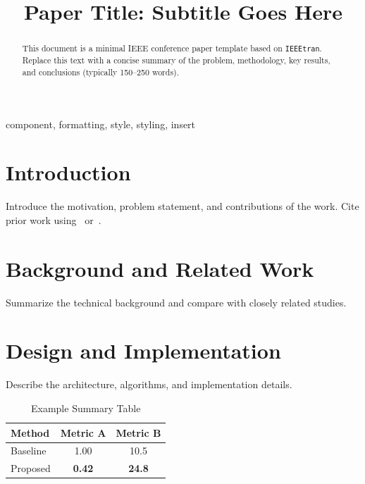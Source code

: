 \documentclass[conference]{IEEEtran}
\begin{document}
\title{Paper Title: Subtitle Goes Here}

\author{
  \and
}

\maketitle

\begin{abstract}
This document is a minimal IEEE conference paper template based on \texttt{IEEEtran}. Replace this text with a concise summary of the problem, methodology, key results, and conclusions (typically 150--250 words).
\end{abstract}

\begin{IEEEkeywords}
component, formatting, style, styling, insert
\end{IEEEkeywords}

\section{Introduction}
Introduce the motivation, problem statement, and contributions of the work. Cite prior work using~\cite{example_conf} or~\cite{example_journal}.

\section{Background and Related Work}
Summarize the technical background and compare with closely related studies.

\section{Design and Implementation}
Describe the architecture, algorithms, and implementation details.

\begin{table}[t]
  \centering
  \caption{Example Summary Table}
  \label{tab:example}
  \begin{tabular}{@{}lcc@{}}
    \toprule
    Method & Metric A & Metric B \\
    \midrule
    Baseline & 1.00 & 10.5 \\
    Proposed & \textbf{0.42} & \textbf{24.8} \\
    \bottomrule
  \end{tabular}
\end{table}
\end{document}

